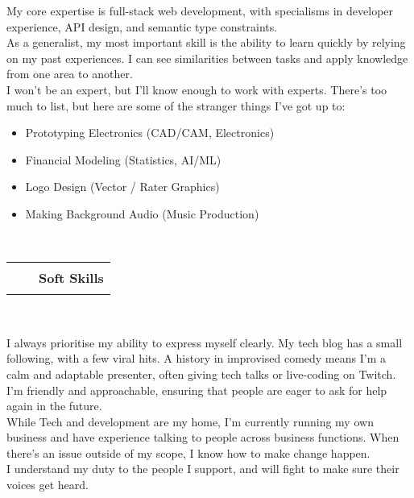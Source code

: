 \documentclass[hidelinks, 12pt, a4paper]{article}
\begin{document}
	\begin{multicols}{2}
		My core expertise is full-stack web development, with specialisms in developer experience, API design, and semantic type constraints.\\
		
		As a generalist, my most important skill is the ability to learn quickly by relying on my past experiences.
		I can see similarities between tasks and apply knowledge from one area to another.\\
		
		I won't be an expert, but I'll know enough to work with experts.
		There's too much to list, but here are some of the stranger things I've got up to:\\
		
		\begin{itemize}[noitemsep,topsep=0pt,partopsep=0pt]
			\item \begin{small}Prototyping Electronics (CAD/CAM, Electronics)\end{small}
			\item \begin{small}Financial Modeling (Statistics, AI/ML)\end{small}
			\item \begin{small}Logo Design (Vector / Rater Graphics)\end{small}
			\item \begin{small}Making Background Audio (Music Production)\end{small}\\
		\end{itemize}
		
	\end{multicols}

	\begin{tabularx}{\textwidth}{@{}Xrr@{}}&
		\rule{50pt}{1pt}&
		\textbf{Soft Skills}
	\end{tabularx}\\

	\begin{multicols}{2}
		I always prioritise my ability to express myself clearly.
		My tech blog has a small following, with a few viral hits.
		A history in improvised comedy means I'm a calm and adaptable presenter, often giving tech talks or live-coding on Twitch.\\
		
		I'm friendly and approachable, ensuring that people are eager to ask for help again in the future.\\
		
		While Tech and development are my home, I'm currently running my own business and have experience talking to people across business functions.
		When there's an issue outside of my scope, I know how to make change happen.\\
		
		I understand my duty to the people I support, and will fight to make sure their voices get heard.\\
	\end{multicols}
	
\end{document}
